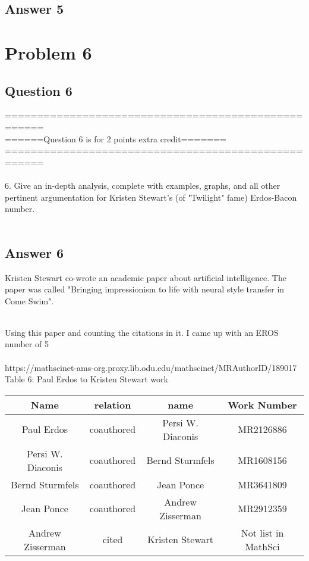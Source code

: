 \documentclass[10pt,letterpaper]{article}
\begin{document}
\subsection{Answer 5}

\pagebreak
\section{Problem 6}
\subsection{Question 6}
====================================================\\
======Question 6 is for 2 points extra credit=======\\
====================================================\\
\\
6.  Give an in-depth analysis, complete with examples, 
graphs, and all other pertinent argumentation for 
Kristen Stewart's (of "Twilight" fame) Erdos-Bacon number.\\
\\
\subsection{Answer 6}

Kristen Stewart co-wrote an academic paper about artificial intelligence.  The paper was called "Bringing impressionism to life with neural style transfer in Come Swim".\\
\\
\cite{http://www.businessinsider.com/twilights-kristen-stewart-co-authored-a-paper-on-artificial-intelligence-2017-1} 

Using this paper and counting the citations in it.  I came up with an EROS number of 5\\
\\
https://mathscinet-ams-org.proxy.lib.odu.edu/mathscinet/MRAuthorID/189017\\ 
Table 6: Paul Erdos to Kristen Stewart work
\begin{center}
  \begin{tabular}{ | c | c | c | c}
    \hline
      Name & relation & name & Work Number\\ \hline
      Paul Erdos & coauthored & Persi W. Diaconis & MR2126886 \\ \hline 
      Persi W. Diaconis & coauthored & Bernd Sturmfels & MR1608156\\ \hline 
      Bernd Sturmfels & coauthored & Jean Ponce & MR3641809\\ \hline 
      Jean Ponce & coauthored & Andrew Zisserman & MR2912359\\ \hline 
      Andrew Zisserman & cited & Kristen Stewart &  Not list in MathSci\\ \hline 
    \hline
  \end{tabular}
\end{center}
\end{document}
